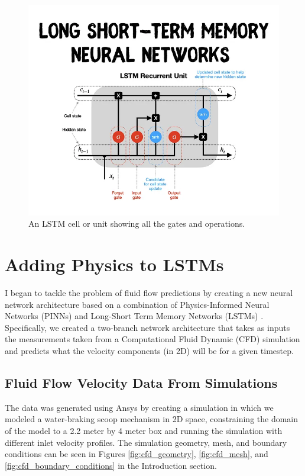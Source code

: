 \begin{figure}[H] \centering
    \includegraphics[width=0.8\linewidth]{figures/lstm_unit.png}
    \caption{An LSTM cell or unit showing all the gates and operations.}
    \label{fig:lstm_cell}
\end{figure}

\section{Adding Physics to LSTMs}
I began to tackle the problem of fluid flow predictions by creating a new neural network architecture based on a combination of Physics-Informed Neural Networks (PINNs) and Long-Short Term Memory Networks (LSTMs) \cite{Perez2022}. Specifically, we created a two-branch network architecture that takes as inputs the measurements taken from a Computational Fluid Dynamic (CFD) simulation and predicts what the velocity components (in 2D) will be for a given timestep.

\subsection{Fluid Flow Velocity Data From Simulations}
The data was generated using Ansys by creating a simulation in which we modeled a water-braking scoop mechanism in 2D space, constraining the domain of the model to a 2.2 meter by 4 meter box and running the simulation with different inlet velocity profiles. The simulation geometry, mesh, and boundary conditions can be seen in Figures \ref{fig:cfd_geometry}, \ref{fig:cfd_mesh}, and \ref{fig:cfd_boundary_conditions} in the Introduction section.

